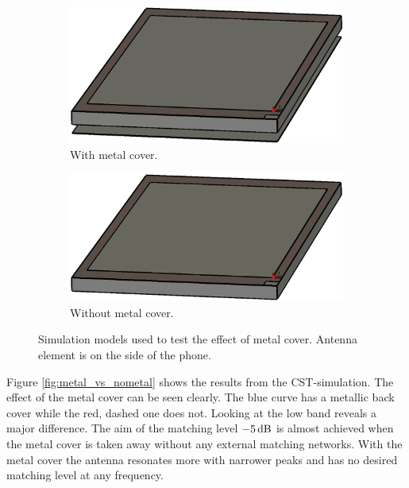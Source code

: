 \begin{figure}[H]
    \centering
    \begin{subfigure}[b]{0.49\textwidth}
    \includegraphics[width=\textwidth]{img/metal_cover.eps}
    \caption{With metal cover.}
    \label{fig:metal_cover}
    \end{subfigure}
    \begin{subfigure}[b]{0.49\textwidth}
    \includegraphics[width=\textwidth]{img/no_metal_cover.eps}
    \caption{Without metal cover.}
    \label{fig:nometal_cover}
    \end{subfigure}
    \caption{Simulation models used to test the effect of metal cover. Antenna element is on the side of the phone.}
    \label{fig:metal_vs_nometal_model}
\end{figure}

Figure \ref{fig:metal_vs_nometal} shows the results from the CST-simulation. The effect of the metal cover can be seen clearly. The blue curve has a metallic back cover while the red, dashed one does not. Looking at the low band reveals a major difference. The aim of the matching level $-5\,\mathrm{dB}$ is almost achieved when the metal cover is taken away without any external matching networks. With the metal cover the antenna resonates more with narrower peaks and has no desired matching level at any frequency. 

